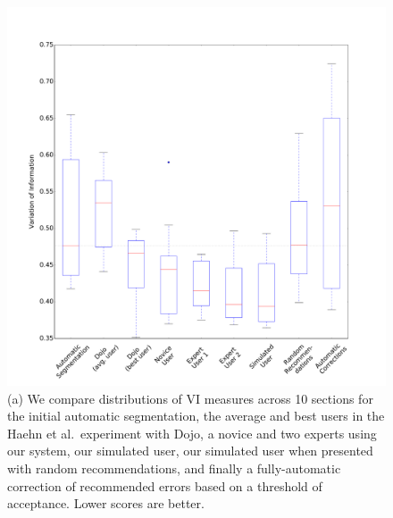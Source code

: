 \begin{figure}[t]
\centering
\includegraphics[scale=.2]{gfx/all_users_vi_dojo.pdf}
\caption{(a) We compare distributions of VI measures across 10 sections for the initial automatic segmentation, the average and best users in the Haehn et al.~experiment with Dojo, a novice and two experts using our system, our simulated user, our simulated user when presented with random recommendations, and finally a fully-automatic correction of recommended errors based on a threshold of acceptance. Lower scores are better.}
\label{fig:results}
\vspace{-0.4cm}
\end{figure}

